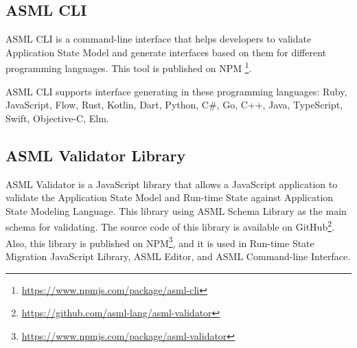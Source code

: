\subsection{ASML CLI}
ASML CLI is a command-line interface that helps developers to validate Application State Model and generate interfaces based on them for different programming languages. This tool is published on NPM \footnote{\url{https://www.npmjs.com/package/asml-cli}}.

ASML CLI supports interface generating in these programming languages:
Ruby, JavaScript, Flow, Rust, Kotlin, Dart, Python, C\#, Go, C++, Java, TypeScript, Swift, Objective-C, Elm.

\subsection{ASML Validator Library}
ASML Validator is a JavaScript library that allows a JavaScript application to validate the Application State Model and Run-time State against Application State Modeling Language. This library using ASML Schema Library as the main schema for validating. The source code of this library is available on GitHub\footnote{\url{https://github.com/asml-lang/asml-validator}}. Also, this library is published on NPM\footnote{\url{https://www.npmjs.com/package/asml-validator}}, and it is used in Run-time State Migration JavaScript Library, ASML Editor, and ASML Command-line Interface.

